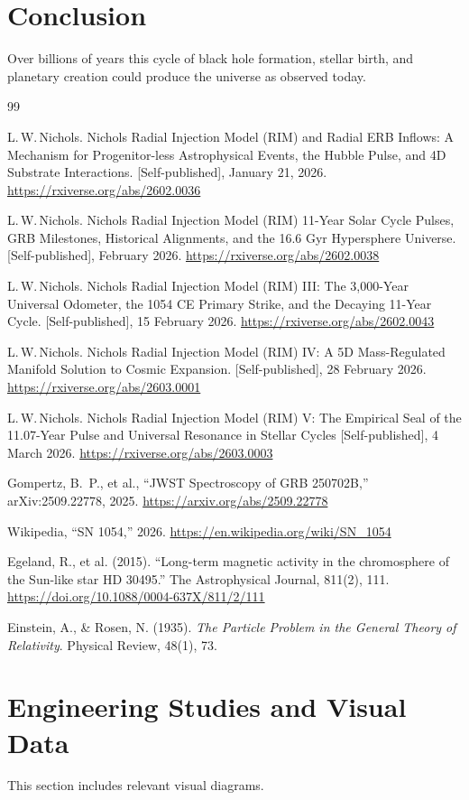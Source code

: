 \documentclass[12pt]{article}
\begin{document}
\section{Conclusion}
Over billions of years this cycle of black hole formation, stellar birth,
and planetary creation could produce the universe as observed today.

\begin{thebibliography}{99}

L.\,W.\,Nichols.
Nichols Radial Injection Model (RIM) and Radial ERB Inflows: A Mechanism for Progenitor-less Astrophysical Events, the Hubble Pulse, and 4D Substrate Interactions.
[Self-published], January 21, 2026.
\newline
\url{https://rxiverse.org/abs/2602.0036}

L.\,W.\,Nichols.
Nichols Radial Injection Model (RIM) 11-Year Solar Cycle Pulses, GRB Milestones, Historical Alignments, and the 16.6 Gyr Hypersphere Universe.
[Self-published], February 2026.
\newline
\url{https://rxiverse.org/abs/2602.0038}

L.\,W.\,Nichols.
Nichols Radial Injection Model (RIM) III: The 3,000-Year Universal Odometer, the 1054 CE Primary Strike, and the Decaying 11-Year Cycle.
[Self-published], 15 February 2026.
\newline
\url{https://rxiverse.org/abs/2602.0043}

L.\,W.\,Nichols.
Nichols Radial Injection Model (RIM) IV: A 5D Mass-Regulated Manifold Solution to Cosmic Expansion.
[Self-published], 28 February 2026.
\newline
\url{https://rxiverse.org/abs/2603.0001}

L.\,W.\,Nichols.
Nichols Radial Injection Model (RIM) V:
The Empirical Seal of the 11.07-Year Pulse
and Universal Resonance in Stellar Cycles
[Self-published], 4 March 2026.
\newline
\url{https://rxiverse.org/abs/2603.0003}

Gompertz, B.\ P., et al.,
``JWST Spectroscopy of GRB 250702B,''
arXiv:2509.22778, 2025.
\newline
\url{https://arxiv.org/abs/2509.22778}

Wikipedia,
``SN 1054,''
2026.
\newline
\url{https://en.wikipedia.org/wiki/SN_1054}

 Egeland, R., et al. (2015).
``Long-term magnetic activity in the chromosphere of the Sun-like star HD 30495.''
The Astrophysical Journal, 811(2), 111.
\url{https://doi.org/10.1088/0004-637X/811/2/111}

Einstein, A., \& Rosen, N. (1935).
\textit{The Particle Problem in the General Theory of Relativity}.
Physical Review, 48(1), 73.

\end{thebibliography}

\newpage

\section{Engineering Studies and Visual Data}
This section includes relevant visual diagrams.


\end{document}
